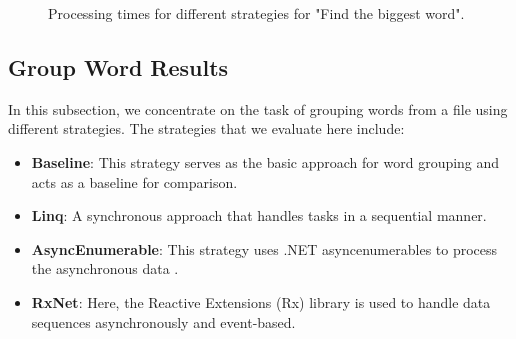 \begin{figure}[H]
    \raggedright
    \caption{Processing times for different strategies for "Find the biggest word".}
    \label{fig:biggest_word_results_cs_2}
\end{figure}

\clearpage


\subsection{Group Word Results}
\label{subsubsec:group_word_processing_times_cs}

In this subsection, we concentrate on the task of grouping words from a file using different strategies. The strategies that we evaluate here include:

\begin{itemize}
    \item \textbf{Baseline}: This strategy serves as the basic approach for word grouping and acts as a baseline for comparison.
    \item \textbf{Linq}: A synchronous approach that handles tasks in a sequential manner.
    \item \textbf{AsyncEnumerable}: This strategy uses .NET asyncenumerables to process the asynchronous data .
    \item \textbf{RxNet}: Here, the Reactive Extensions (Rx) library is used to handle data sequences asynchronously and event-based.
\end{itemize}



